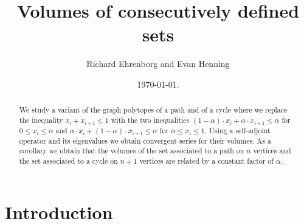 \documentclass[11pt,reqno]{amsart}
\theoremstyle{definition}
\numberwithin{equation}{section}
\begin{document}
\title{Volumes of consecutively defined sets}

\author{Richard Ehrenborg and Evan Henning}

\address{Department of Mathematics, University of Kentucky, Lexington,
  KY 40506-0027, USA.\hfill\break \tt http://www.math.uky.edu/\~{}jrge/,
  richard.ehrenborg@uky.edu.}


\address{Department of Mathematics, University of Kentucky, Lexington,
  KY 40506-0027, USA.\hfill\break \tt 
  ehe294@uky.edu.}


\date{\today.}

\begin{abstract}
We study a variant of the graph polytopes of a path
and of a cycle
where we replace the inequality
$x_{i} + x_{i+1} \leq 1$
with the two inequalities
$(1-\alpha) \cdot x_{i} + \alpha \cdot x_{i+1} \leq \alpha$
for $0 \leq x_{i} \leq \alpha$
and
$\alpha \cdot x_{i} + (1-\alpha) \cdot x_{i+1} \leq \alpha$
for $\alpha \leq x_{i} \leq 1$.
Using a self-adjoint operator
and its eigenvalues we obtain
convergent series for their volumes.
As a corollary we obtain that the volumes
of the set associated to a path on $n$ vertices
and
the set associated to a cycle on $n+1$ vertices
are related by a constant factor of $\alpha$.
\end{abstract}


\maketitle

\section{Introduction}
\end{document}
